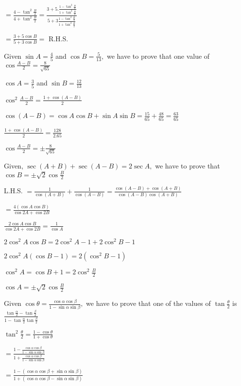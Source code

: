   $= \frac{4 - \tan^2\frac{B}{2}}{4 + \tan^2\frac{B}{2}} = \frac{3 + 5.\frac{1 - \tan^2\frac{B}{2}}{1 +
    \tan^2\frac{B}{2}}}{5 + 3\frac{1 - \tan^2\frac{B}{2}}{1 + \tan^2\frac{B}{2}}}$

  $= \frac{3 + 5\cos B}{5 + 3\cos B} =$ R.H.S.

\item Given $\sin A = \frac{4}{5}$ and $\cos B = \frac{5}{13},$ we have to prove that one value of $\cos \frac{A -
  B}{2} = \frac{8}{\sqrt{65}}$

  $\cos A = \frac{3}{5}$ and $\sin B = \frac{12}{13}$

  $\cos^2\frac{A - B}{2} = \frac{1 + \cos(A - B)}{2}$

  $\cos(A - B) = \cos A\cos B + \sin A\sin B = \frac{15}{65} + \frac{48}{65} = \frac{63}{65}$

  $\frac{1 + \cos(A - B)}{2} = \frac{128}{2.65}$

  $\cos\frac{A - B}{2} = \pm\frac{8}{\sqrt{65}}$

\item Given, $\sec(A + B) + \sec(A - B) = 2\sec A,$ we have to prove that $\cos B = \pm \sqrt{2}\cos \frac{B}{2}$

  L.H.S. $= \frac{1}{\cos(A + B)} + \frac{1}{\cos(A - B)} = \frac{\cos(A - B) + \cos (A + B)}{\cos(A - B)\cos(A + B)}$

  $= \frac{4(\cos A\cos B)}{\cos 2A + \cos 2B}$

  $\frac{2\cos A\cos B}{\cos 2A + \cos 2B} = \frac{1}{\cos A}$

  $2\cos^2A\cos B = 2\cos^2A - 1 + 2\cos^2B - 1$

  $2\cos^2A(\cos B - 1) = 2(\cos^2B - 1)$

  $\cos^2A = \cos B + 1 = 2\cos^2\frac{B}{2}$

  $\cos A = \pm\sqrt{2}\cos\frac{B}{2}$

\item Given $\cos \theta = \frac{\cos\alpha\cos\beta}{1 - \sin\alpha\sin\beta},$ we have to prove that one of the values of
  $\tan \frac{\theta}{2}$ is $\frac{\tan \frac{\alpha}{2} - \tan\frac{\beta}{2}}{1 -
  \tan\frac{\alpha}{2}\tan\frac{\beta}{2}}$

  $\tan^2\frac{\theta}{2} = \frac{1 - \cos\theta}{1 + \cos\theta}$

  $= \frac{1 - \frac{\cos\alpha\cos\beta}{1 - \sin\alpha\sin\beta}}{1 + \frac{\cos\alpha\cos\beta}{1 -
    \sin\alpha\sin\beta}}$

  $= \frac{1 - (\cos\alpha\cos\beta + \sin\alpha\sin\beta)}{1 + (\cos\alpha\cos\beta - \sin\alpha\sin\beta)}$

